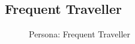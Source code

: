 \documentclass[a4paper,12pt]{report}
\begin{document}
\subsection{Frequent Traveller}
\begin{figure}[!htb]
	\caption{\label{fig:frequent_traveller}Persona: Frequent Traveller}	
\end{figure}

\FloatBarrier
\end{document}
